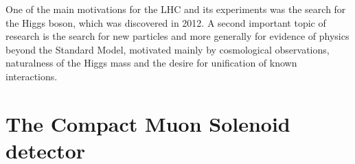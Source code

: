 One of the main motivations for the LHC and its experiments was the search for the Higgs boson, which was discovered in 2012. A second important topic of research is the search for new particles and more generally for evidence of physics beyond the Standard Model, motivated mainly by cosmological observations, naturalness of the Higgs mass and the desire for unification of known interactions.

\newpage


\section{The Compact Muon Solenoid detector~\label{sec:CMS}}


